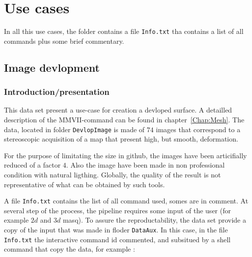

\chapter{Use cases}

In all this use cases, the folder contains a file {\tt Info.txt} tha contains a list of
all commands plus some brief commentary.


\section{Image devlopment}

\subsection{Introduction/presentation}

This data set present a use-case for creation a devloped surface.  A detailled
description of the MMVII-command can be found in chapter~\ref{Chap:Mesh}.
The data, located in folder {\tt DevlopImage}  is made of $74$ images that correspond to a stereoscopic
acquisition of a map that present high, but smooth, deformation.


For the purpose of limitating the size in github, the images have been articifially
reduced of a factor $4$. Also the image have been made in non professional
condition with natural ligthing. Globally, the quality of the result is
not representative of what can be obtained by such tools.

A file {\tt Info.txt} contains the list of all command used, somes are in
comment.
At several step of the process, the pipeline requires some input of the user
(for example $2d$ and $3d$ masq).  To assure the reproductability, the 
data set provide a copy of the input that was made in floder {\tt DataAux}. 
In this case, in the file {\tt Info.txt}  the interactive command id commented, and subsitued
by a shell command that copy the data, for example :

